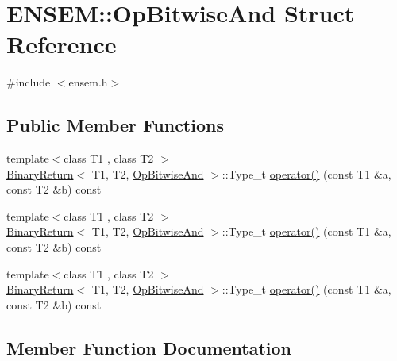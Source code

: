 \hypertarget{structENSEM_1_1OpBitwiseAnd}{}\section{E\+N\+S\+EM\+:\+:Op\+Bitwise\+And Struct Reference}
\label{structENSEM_1_1OpBitwiseAnd}


{\ttfamily \#include $<$ensem.\+h$>$}

\subsection*{Public Member Functions}
\begin{DoxyCompactItemize}
\item 
{\footnotesize template$<$class T1 , class T2 $>$ }\\\mbox{\hyperlink{structENSEM_1_1BinaryReturn}{Binary\+Return}}$<$ T1, T2, \mbox{\hyperlink{structENSEM_1_1OpBitwiseAnd}{Op\+Bitwise\+And}} $>$\+::Type\+\_\+t \mbox{\hyperlink{structENSEM_1_1OpBitwiseAnd_aa0d3491aacf78f315c39f90394d4fa86}{operator()}} (const T1 \&a, const T2 \&b) const
\item 
{\footnotesize template$<$class T1 , class T2 $>$ }\\\mbox{\hyperlink{structENSEM_1_1BinaryReturn}{Binary\+Return}}$<$ T1, T2, \mbox{\hyperlink{structENSEM_1_1OpBitwiseAnd}{Op\+Bitwise\+And}} $>$\+::Type\+\_\+t \mbox{\hyperlink{structENSEM_1_1OpBitwiseAnd_aa0d3491aacf78f315c39f90394d4fa86}{operator()}} (const T1 \&a, const T2 \&b) const
\item 
{\footnotesize template$<$class T1 , class T2 $>$ }\\\mbox{\hyperlink{structENSEM_1_1BinaryReturn}{Binary\+Return}}$<$ T1, T2, \mbox{\hyperlink{structENSEM_1_1OpBitwiseAnd}{Op\+Bitwise\+And}} $>$\+::Type\+\_\+t \mbox{\hyperlink{structENSEM_1_1OpBitwiseAnd_aa0d3491aacf78f315c39f90394d4fa86}{operator()}} (const T1 \&a, const T2 \&b) const
\end{DoxyCompactItemize}


\subsection{Member Function Documentation}
\mbox{\label{structENSEM_1_1OpBitwiseAnd_aa0d3491aacf78f315c39f90394d4fa86}} 
